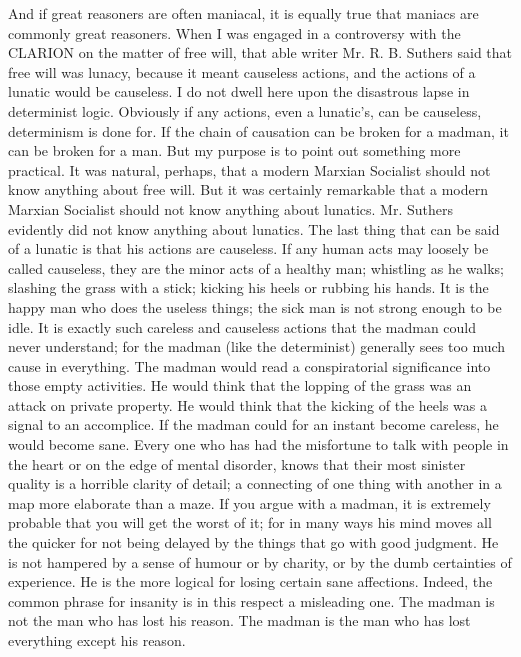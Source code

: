 And if great reasoners are often maniacal, it is equally true that maniacs are commonly great reasoners. When I was engaged in a controversy with the CLARION on the matter of free will, that able writer Mr. R. B. Suthers said that free will was lunacy, because it meant causeless actions, and the actions of a lunatic would be causeless. I do not dwell here upon the disastrous lapse in determinist logic. Obviously if any actions, even a lunatic’s, can be causeless, determinism is done for. If the chain of causation can be broken for a madman, it can be broken for a man. But my purpose is to point out something more practical. It was natural, perhaps, that a modern Marxian Socialist should not know anything about free will. But it was certainly remarkable that a modern Marxian Socialist should not know anything about lunatics. Mr. Suthers evidently did not know anything about lunatics. The last thing that can be said of a lunatic is that his actions are causeless. If any human acts may loosely be called causeless, they are the minor acts of a healthy man; whistling as he walks; slashing the grass with a stick; kicking his heels or rubbing his hands. It is the happy man who does the useless things; the sick man is not strong enough to be idle. It is exactly such careless and causeless actions that the madman could never understand; for the madman (like the determinist) generally sees too much cause in everything. The madman would read a conspiratorial significance into those empty activities. He would think that the lopping of the grass was an attack on private property. He would think that the kicking of the heels was a signal to an accomplice. If the madman could for an instant become careless, he would become sane. Every one who has had the misfortune to talk with people in the heart or on the edge of mental disorder, knows that their most sinister quality is a horrible clarity of detail; a connecting of one thing with another in a map more elaborate than a maze. If you argue with a madman, it is extremely probable that you will get the worst of it; for in many ways his mind moves all the quicker for not being delayed by the things that go with good judgment. He is not hampered by a sense of humour or by charity, or by the dumb certainties of experience. He is the more logical for losing certain sane affections. Indeed, the common phrase for insanity is in this respect a misleading one. The madman is not the man who has lost his reason. The madman is the man who has lost everything except his reason.


